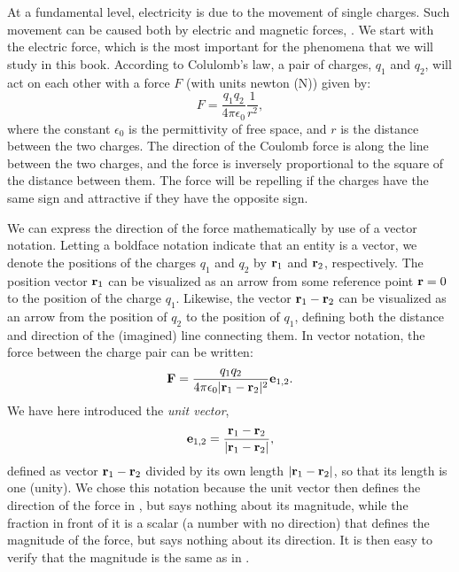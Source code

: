 At a fundamental level, electricity is due to the movement of single charges. Such movement can be caused both by electric and magnetic forces, . We start with the electric force, which is the most important for the phenomena that we will study in this book. According to Colulomb's law, a pair of charges, $q_1$ and $q_2$, will act on each other with a force $F$ (with units newton (\si{\newton})) given by:
\begin{equation}
F = \frac{q_1q_2}{4\pi \epsilon_0} \frac{1}{r^2},
\label{eq:Basics:CoulombF}
\end{equation}
where the constant $\epsilon_0$ is the permittivity of free space, and $r$ is the distance between the two charges. The direction of the Coulomb force is along the line between the two charges, and the force is inversely proportional to the square of the distance between them. The force will be repelling if the charges have the same sign and attractive if they have the opposite sign. 

We can express the direction of the force mathematically by use of a vector notation. Letting a boldface notation indicate that an entity is a vector, we denote the positions of the charges $q_1$ and $q_2$ by ${\bf r}_1$ and ${\bf r}_2$, respectively. The position vector ${\bf r}_1$ can be visualized as an arrow from some reference point ${\bf r} =0$ to the position of the charge $q_1$. Likewise, the vector ${\bf r}_1-{\bf r}_2$ can be visualized as an arrow from the position of $q_2$ to the position of $q_1$, defining both the distance and direction of the (imagined) line connecting them. In vector notation, the force between the charge pair can be written:
\begin{equation}
{\bf F} = \frac{q_1q_2}{4\pi \epsilon_0 |{\bf r}_1-{\bf r}_2|^2} {{\bf e}}_{1,2}.
\label{eq:Basics:CoulombFvec}
\end{equation}
We have here introduced the \textit{unit vector},
\begin{equation}
{{\bf e}}_{1,2} = \frac{{\bf r}_1 - {\bf r}_2}{|{\bf r}_1-{\bf r}_2|},
\label{eq:Basics:UnitVector}
\end{equation}
defined as vector ${\bf r}_1-{\bf r}_2$ divided by its own length $|{\bf r}_1-{\bf r}_2|$, so that its length is one (unity). We chose this notation because the unit vector then defines the direction of the force in , but says nothing about its magnitude, while the fraction in front of it is a scalar (a number with no direction) that defines the magnitude of the force, but  says nothing about its direction. It is then easy to verify that the magnitude is the same as in .

